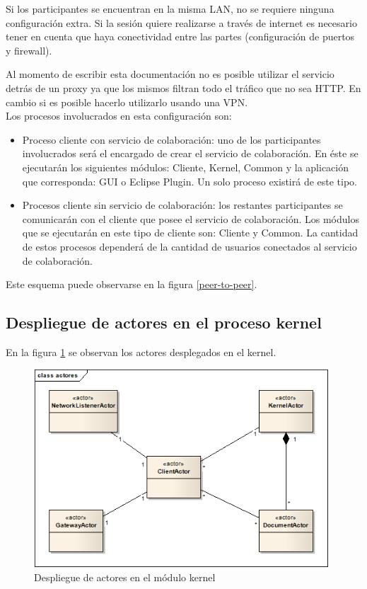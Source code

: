\documentclass[12pt,a4paper]{article}
\begin{document}
Si los participantes se encuentran en la misma LAN, no se requiere ninguna configuración extra. Si la sesión quiere realizarse
a través de internet es necesario tener en cuenta que haya conectividad entre las partes (configuración de puertos y firewall).

Al momento de escribir esta documentación no es posible utilizar el servicio detrás de un proxy ya que los mismos
filtran todo el tráfico que no sea HTTP. En cambio si es posible hacerlo utilizarlo usando una VPN. \\

Los procesos involucrados en esta configuración son:
\begin{itemize}
	\item Proceso cliente con servicio de colaboración: uno de los participantes involucrados será el encargado de crear el
	servicio de colaboración. En éste se ejecutarán los siguientes módulos: Cliente, Kernel, Common y la aplicación que
	corresponda: GUI o Eclipse Plugin. Un solo proceso existirá de este tipo.
	\item Procesos cliente sin servicio de colaboración: los restantes participantes se comunicarán con el cliente que posee
	el servicio de colaboración. Los módulos que se ejecutarán en este tipo de cliente son: Cliente y Common. La cantidad de
	estos procesos dependerá de la cantidad de usuarios conectados al servicio de colaboración.
\end{itemize}

Este esquema puede observarse en la figura \ref{peer-to-peer}.

\subsection{Despliegue de actores en el proceso kernel}

En la figura \ref{actores-kernel} se observan los actores desplegados en el kernel.

	\begin{figure}[!ht]
		\begin{center}
			\includegraphics[width=11cm]{actores-kernel.png}
			\caption{\label{actores-kernel} Despliegue de actores en el módulo kernel }
		\end{center}
	\end{figure}
\end{document}

